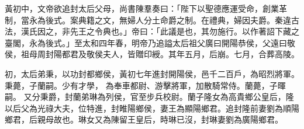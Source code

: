\begin{pinyinscope}
 
 
 
 黃初中，文帝欲追封太后父母，尚書陳羣奏曰：「陛下以聖德應運受命，創業革制，當永為後式。案典籍之文，無婦人分土命爵之制。在禮典，婦因夫爵。秦違古法，漢氏因之，非先王之令典也。」帝曰：「此議是也，其勿施行。以作著詔下藏之臺閣，永為後式。」至太和四年春，明帝乃追謚太后祖父廣曰開陽恭侯，父遠曰敬侯，祖母周封陽都君及敬侯夫人，皆贈印綬。其年五月，后崩。七月，合葬高陵。
 
 
初，太后弟秉，以功封都鄉侯，黃初七年進封開陽侯，邑千二百戶，為昭烈將軍。
 秉薨，子蘭嗣。少有才學，
 為奉車都尉、游擊將軍，加散騎常侍。蘭薨，子暉嗣。
 又分秉爵，封蘭弟琳為列侯，官至步兵校尉。蘭子隆女為高貴鄉公皇后，隆以后父為光祿大夫，位特進，封睢陽鄉侯，妻王為顯陽鄉君。追封隆前妻劉為順陽鄉君，后親母故也。琳女又為陳留王皇后，時琳已沒，封琳妻劉為廣陽鄉君。
 
 
\end{pinyinscope}